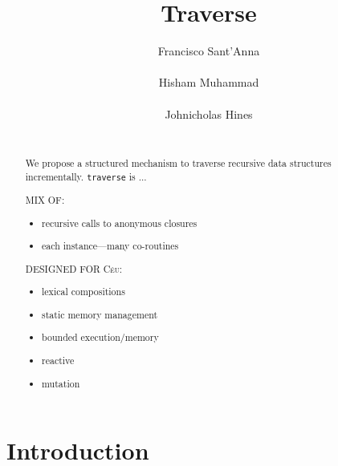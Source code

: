 \documentclass{acm_proc_article-sp}
\newcommand{\CEU}{\textsc{C\'{e}u}\xspace}
\newcommand{\code}[1] {{\small{\texttt{#1}}}}
\begin{document}
\title{Traverse}

\author{
\alignauthor
Francisco Sant'Anna \\
     \\
\alignauthor
Hisham Muhammad \\
     \\
\alignauthor
Johnicholas Hines \\
     \\
}

\maketitle
\begin{abstract}
We propose a structured mechanism to traverse recursive data structures 
incrementally.
\code{traverse} is ...


MIX OF:
\begin{itemize}
    \item recursive calls to anonymous closures
    \item each instance---many co-routines
\end{itemize}

DESIGNED FOR \CEU:
\begin{itemize}
    \item lexical compositions
    \item static memory management
    \item bounded execution/memory
    \item reactive
    \item mutation
\end{itemize}


\end{abstract}




\section{Introduction}
\end{document}
